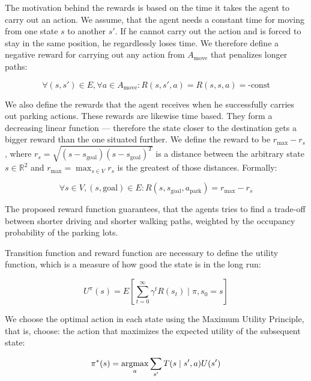 The motivation behind the rewards is based on the time it takes the agent to
carry out an action. We assume, that the agent needs a constant time for
moving from one state $s$ to another $s'$. If he cannot carry out the action
and is forced to stay in the same position, he regardlessly loses time. We
therefore define a negative reward for carrying out any action from
$A_{\mbox{move}}$ that penalizes longer paths:

\begin{equation}
\forall (s, s') \in E, \forall a \in A_{\mbox{move}}: R(s, s', a) = R(s, s, a) = \mbox{-const}
\end{equation}

We also define the rewards that the agent receives when he successfully
carries out parking actions. These rewards are likewise time based. They form
a decreasing linear function --- therefore the state closer to the destination
gets a bigger reward than the one situated further. We define the reward to be
$r_{\max} - r_s$, where $r_s = \sqrt{(s - s_{\mbox{goal}}) {(s -
s_{\mbox{goal}})}^T}$ is a distance between the arbitrary state $s \in
\mathbb{R}^2$ and $r_{\max} = \max_{s \in V}r_s$ is the greatest of those
distances. Formally:

\begin{equation}
\forall s \in V, (s,\mbox{goal}) \in E : R(s, s_{\mbox{goal}}, a_{\mbox{park}}) = r_{\max} - r_s
\end{equation}

The proposed reward function guarantees, that the agents tries to find a
trade-off between shorter driving and shorter walking paths, weighted by the
occupancy probability of the parking lots.

Transition function and reward function are necessary to define the utility
function, which is a measure of how good the state is in the long run:

\begin{equation}
U^{\pi}(s) = E\left[\sum_{t=0}^{\infty} \gamma^t R(s_t) \mid \pi,s_0 = s \right]
\end{equation}

We choose the optimal action in each state using the Maximum Utility
Principle, that is, choose: the action that maximizes the expected utility of
the subsequent state:

\begin{equation}
\label{lbl:optimal_policy}
\pi^*(s) = \mathop{\rm argmax}_a \sum_{s'} T(s \mid s', a)U(s')
\end{equation}

